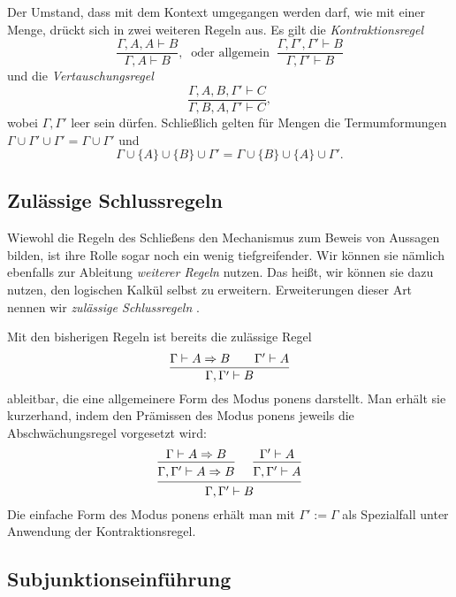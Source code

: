 Der Umstand, dass mit dem Kontext umgegangen werden darf, wie mit
einer Menge, drückt sich in zwei weiteren Regeln aus. Es gilt die
\emph{Kontraktionsregel}
\[\dfrac{\Gamma,A,A\vdash B}{\Gamma,A\vdash B},\;\;
\text{oder allgemein}\;\;\dfrac{\Gamma,\Gamma',\Gamma'\vdash B}{\Gamma,\Gamma'\vdash B}\]
und die \emph{Vertauschungsregel}
\[\dfrac{\Gamma,A,B,\Gamma'\vdash C}{\Gamma,B,A,\Gamma'\vdash C},\]
wobei $\Gamma,\Gamma'$ leer sein dürfen. Schließlich gelten für Mengen
die Termumformungen
$\Gamma\cup\Gamma'\cup\Gamma' = \Gamma\cup\Gamma'$
und
\[\Gamma\cup\{A\}\cup\{B\}\cup\Gamma' = \Gamma\cup\{B\}\cup\{A\}\cup\Gamma'.\]


\subsection{Zulässige Schlussregeln}

Wiewohl die Regeln des Schließens den Mechanismus zum Beweis
von Aussagen bilden, ist ihre Rolle sogar noch ein wenig tiefgreifender.
Wir können sie nämlich ebenfalls zur Ableitung \emph{weiterer Regeln}
nutzen. Das heißt, wir können sie dazu nutzen, den logischen Kalkül
selbst zu erweitern. Erweiterungen dieser Art nennen wir
\emph{zulässige Schlussregeln}%
.

Mit den bisherigen Regeln ist bereits die zulässige Regel
\[\dfrac{\Gamma\vdash A\Rightarrow B\qquad\Gamma'\vdash A}
{\Gamma,\Gamma'\vdash B}\]
ableitbar, die eine allgemeinere Form des Modus ponens darstellt. Man
erhält sie kurzerhand, indem den Prämissen des Modus
ponens jeweils die Abschwächungsregel vorgesetzt wird:
\[\begin{prooftree}
    \hypo{\Gamma\vdash A\cond B}
  \infer1{\Gamma,\Gamma'\vdash A\cond B}
    \hypo{\Gamma'\vdash A}
  \infer1{\Gamma,\Gamma'\vdash A}
\infer2{\Gamma,\Gamma'\vdash B}
\end{prooftree}\]
Die einfache Form des Modus ponens erhält man mit $\Gamma':=\Gamma$ als
Spezialfall unter Anwendung der Kontraktionsregel.

\subsection{Subjunktionseinführung}

